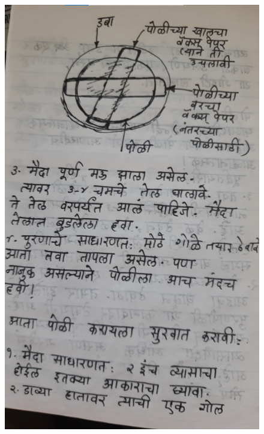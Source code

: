 \documentclass[17pt]{extarticle}  %
\begin{document}
\begin{figure}[h!]
    \centering
    \includegraphics{img/10-s.png}
\end{figure}
\end{document}
